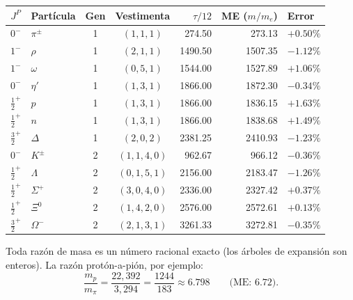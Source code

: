 \documentclass[11pt, a4paper, openany]{book}
\begin{document}
\medskip
\begin{center}
\renewcommand{\arraystretch}{1.3}
\begin{tabular}{clccrrl}
\toprule
$J^P$ & Part\'icula & Gen & Vestimenta & $\tau/12$ & ME ($m/m_e$)
  & Error \\
\midrule
$0^-$             & $\pi^{\pm}$ & 1 & $(1,1,1)$     & 274{.}50 & 273{.}13 & $+0{.}50\%$ \\
$1^-$             & $\rho$       & 1 & $(2,1,1)$     & 1490{.}50 & 1507{.}35 & $-1{.}12\%$ \\
$1^-$             & $\omega$     & 1 & $(0,5,1)$     & 1544{.}00 & 1527{.}89 & $+1{.}06\%$ \\
$0^-$             & $\eta'$      & 1 & $(1,3,1)$     & 1866{.}00 & 1872{.}30 & $-0{.}34\%$ \\
$\frac{1}{2}^+$   & $p$          & 1 & $(1,3,1)$     & 1866{.}00 & 1836{.}15 & $+1{.}63\%$ \\
$\frac{1}{2}^+$   & $n$          & 1 & $(1,3,1)$     & 1866{.}00 & 1838{.}68 & $+1{.}49\%$ \\
$\frac{3}{2}^+$   & $\Delta$     & 1 & $(2,0,2)$     & 2381{.}25 & 2410{.}93 & $-1{.}23\%$ \\
\midrule
$0^-$             & $K^{\pm}$    & 2 & $(1,1,4,0)$   & 962{.}67  & 966{.}12  & $-0{.}36\%$ \\
$\frac{1}{2}^+$   & $\Lambda$    & 2 & $(0,1,5,1)$   & 2156{.}00 & 2183{.}47 & $-1{.}26\%$ \\
$\frac{1}{2}^+$   & $\Sigma^+$   & 2 & $(3,0,4,0)$   & 2336{.}00 & 2327{.}42 & $+0{.}37\%$ \\
$\frac{1}{2}^+$   & $\Xi^0$      & 2 & $(1,4,2,0)$   & 2576{.}00 & 2572{.}61 & $+0{.}13\%$ \\
$\frac{3}{2}^+$   & $\Omega^-$   & 2 & $(2,1,3,1)$   & 3261{.}33 & 3272{.}81 & $-0{.}35\%$ \\
\bottomrule
\end{tabular}
\end{center}

\medskip
\noindent
Toda raz\'on de masa es un n\'umero racional exacto (los \'arboles de
expansi\'on son enteros).  La raz\'on prot\'on-a-pi\'on, por ejemplo:
\[
  \frac{m_p}{m_\pi} = \frac{22{,}392}{3{,}294}
  = \frac{1244}{183} \approx 6{.}798
  \qquad\text{(ME: 6{.}72)}.
\]
\end{document}
